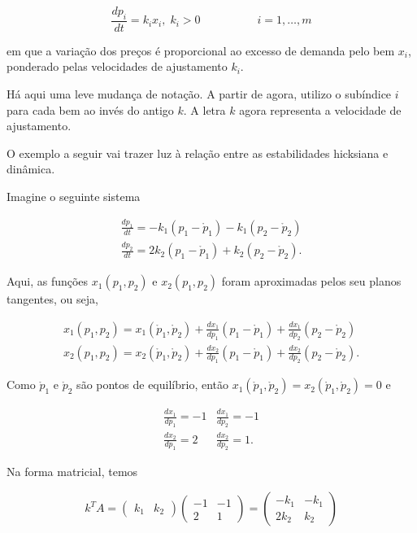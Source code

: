\documentclass[
	12pt,				%
	openright,			%
	twoside,			%
	a4paper,			%
	english,			%
	french,				%
	spanish,			%
	brazil				%
	]{abntex2}
\newcommand{\espaco}{\hspace{5em}}
\newcommand{\pbola}{\mathring{p}}
\begin{document}
\begin{equation}
	\frac{dp_i}{dt} = k_i x_i, \; k_i > 0 \espaco i = 1, \ldots, m
\end{equation}

em que a variação dos preços é proporcional
ao excesso de demanda pelo bem $x_i$, ponderado pelas velocidades de ajustamento $k_i$.

Há aqui uma leve mudança de notação. A partir de agora, utilizo o subíndice
$i$ para cada bem ao invés do antigo $k$. A letra $k$ agora representa a velocidade de ajustamento.

O exemplo a seguir vai trazer luz à relação entre as estabilidades hicksiana e dinâmica.

Imagine o seguinte sistema

\begin{equation}
	\begin{matrix}
		\frac{dp_1}{dt} = - k_1(p_1 - \pbola_1) - k_1(p_2 - \pbola_2) \\
		\frac{dp_2}{dt} = 2 k_2(p_1 - \pbola_1) + k_2(p_2 - \pbola_2).
	\end{matrix}
\end{equation}

Aqui, as funções $x_1(p_1, p_2)$ e $x_2(p_1, p_2)$ foram aproximadas pelos seu planos tangentes,
ou seja,

\begin{equation} \label{sist2}
	\begin{matrix}
		x_1(p_1, p_2) = x_1(\pbola_1, \pbola_2) + \frac{dx_1}{dp_1}(p_1 - \pbola_1) + \frac{dx_1}{dp_2}(p_2 - \pbola_2) \\
		x_2(p_1, p_2) = x_2(\pbola_1, \pbola_2) + \frac{dx_2}{dp_1}(p_1 - \pbola_1) + \frac{dx_2}{dp_2}(p_2 - \pbola_2).
	\end{matrix}
\end{equation}

Como $\pbola_1$ e $\pbola_2$ são pontos de equilíbrio, então $x_1(\pbola_1, \pbola_2)
= x_2(\pbola_1, \pbola_2) = 0$ e

\begin{equation}
	\begin{matrix}
		\frac{dx_1}{dp_1} = -1 & \frac{dx_1}{dp_2} = -1 \\
		\frac{dx_2}{dp_1} = 2 & \frac{dx_2}{dp_2} = 1.
	\end{matrix}
\end{equation}

Na forma matricial, temos

\begin{equation}
	k^TA =
	\begin{pmatrix}
		k_1 & k_2
	\end{pmatrix}
	\begin{pmatrix}
		-1 & -1 \\
		2 & 1
	\end{pmatrix} =
	\begin{pmatrix}
		-k_1 & -k_1 \\
		2k_2 & k_2
	\end{pmatrix}
\end{equation}
\end{document}
